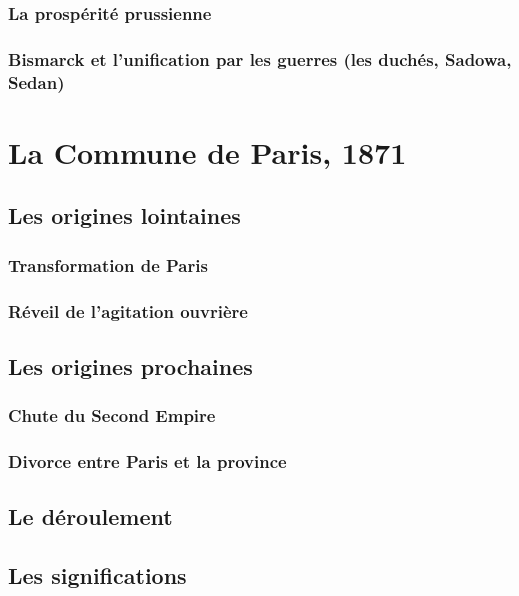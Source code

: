 \documentclass[12pt]{report}
\begin{document}
\subsubsection{La prospérité prussienne}

\subsubsection{Bismarck et l'unification par les guerres (les duchés, Sadowa, Sedan)}

\section{La Commune de Paris, 1871}

\subsection{Les origines lointaines}

\subsubsection{Transformation de Paris}

\subsubsection{Réveil de l'agitation ouvrière}

\subsection{Les origines prochaines}

\subsubsection{Chute du Second Empire}

\subsubsection{Divorce entre Paris et la province}

\subsection{Le déroulement}

\subsection{Les significations}
\end{document}
